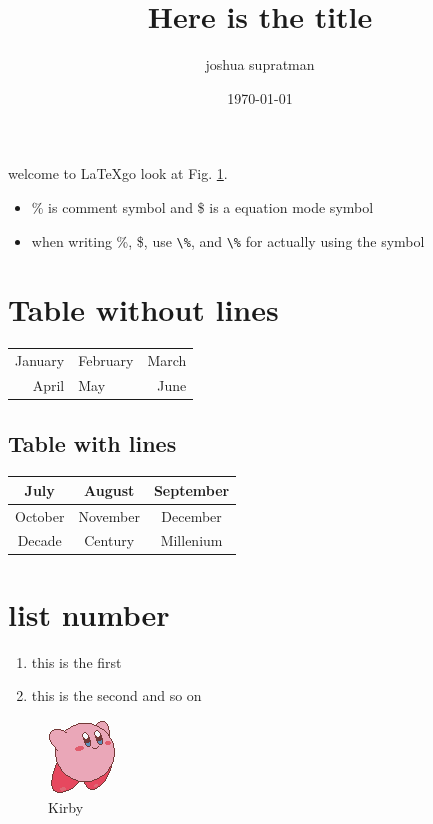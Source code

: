 \documentclass{article}
\title{Here is the title}
\author{joshua supratman}
\date{\today}
\begin{document}
\maketitle
welcome to \LaTeX go look at Fig. \ref{fig:kirby}.
\tableofcontents
\pagebreak
\begin{itemize}
	\item \% is comment symbol and \$ is a equation mode symbol
	\item when writing \%, \$, use \verb|\%|, and \verb|\%| for actually using the symbol
\end{itemize}

\section{Table without lines}
\begin{tabular}{rlr} %
	January & February & March \\
	April & May & June \\
\end{tabular}

\subsection{Table with lines}
\begin{tabular}{|c|c||c|} %
	\hline
	July & August & September \\
	\hline
	October & November & December \\
	Decade& Century & Millenium \\
	\hline
\end{tabular}

\section{list number}
\begin{enumerate}
	\item this is the first
	\item this is the second and so on
\end{enumerate}

\begin{figure}[htbp]
\begin{center}
\includegraphics{kirby.png}
\caption{Kirby}
\label{fig:kirby}
\end{center}
\end{figure}
\end{document}
